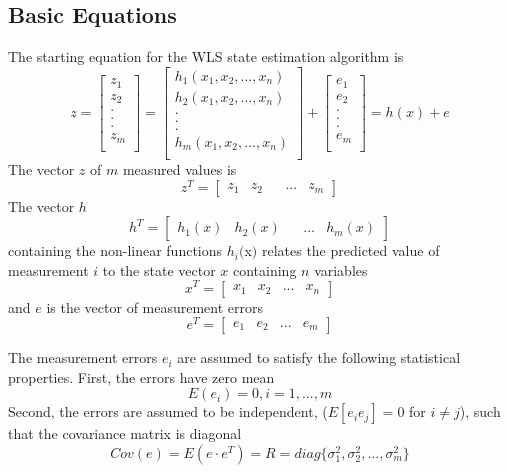 \documentclass[12pt]{article}
\begin{document}
\subsection*{Basic Equations}
The starting equation for the WLS state estimation algorithm is
\begin{equation}\label{eq:main}
z=\begin{bmatrix} z_1\\ z_2\\ .\\ .\\ .\\ z_m\\ \end{bmatrix} =
\begin{bmatrix} h_1(x_1,x_2,...,x_n)\\ h_2(x_1,x_2,...,x_n)\\ .\\ .\\ .\\ h_m(x_1,x_2,...,x_n)\\ \end{bmatrix}+\begin{bmatrix} e_1\\ e_2\\ .\\ .\\ .\\ e_m\\ \end{bmatrix}
=h(x)+e
\end{equation} 
The vector $z$ of $m$ measured values is
\[
z^{T} = \begin{bmatrix} z_1 & z_2 && ... & z_{m}\end{bmatrix}
\]
The vector $h$
\[
h^{T} = \begin{bmatrix} h_1(x) & h_2(x) && ... & h_{m}(x) \end{bmatrix}
\]
containing the non-linear functions $h_{i}($x$)$ relates the predicted value of
measurement $i$ to the state vector $x$ containing $n$ variables
\[
x^{T} = \begin{bmatrix} x_{1} & x_{2} & ... & x_{n} \end{bmatrix}
\]
and $e$ is the vector of measurement errors
\[
e^{T} = \begin{bmatrix} e_{1} & e_{2} & ... & e_{m} \end{bmatrix}
\]

The measurement errors $e_i$ are assumed to satisfy the following statistical
properties. First, the errors have zero mean
\begin{equation}
E(e_i) = 0, i = 1,...,m
\end{equation} 
Second, the errors are assumed to be independent,
($E[e_i e_j]=0$ for $i\ne j$), such that the covariance matrix is diagonal
\begin{equation}
Cov(e)=E(e\cdot e^T) = R =diag \{{\sigma_1 ^2,\sigma_2^2,...,\sigma_m ^2}\}
\end{equation} 
\end{document}
